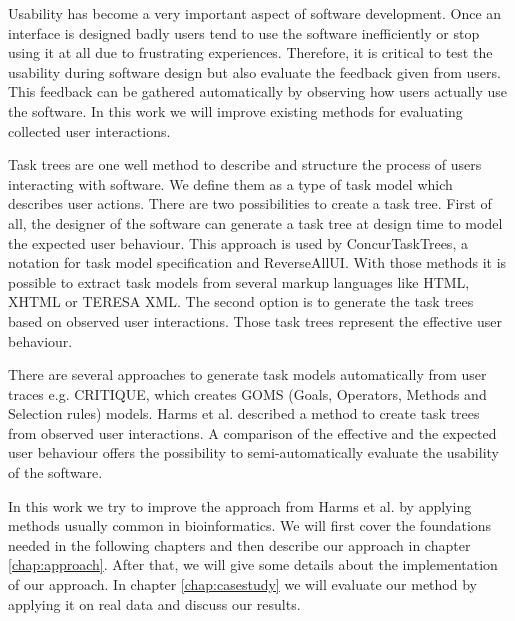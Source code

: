 Usability has become a very important aspect of software development. 
Once an interface is designed badly users tend to use the software inefficiently or stop using it at all due to frustrating experiences.
Therefore, it is critical to test the usability during software design but also evaluate the feedback given from users. 
This feedback can be gathered automatically by observing how users actually use the software.
In this work we will improve existing methods for evaluating collected user interactions.

Task trees are one well method to describe and structure the process of users interacting with software. 
We define them as a type of task model which describes user actions. 
There are two possibilities to create a task tree.
First of all, the designer of the software can generate a task tree at design time to model the expected user behaviour\cite{harms2013}.
This approach is used by ConcurTaskTrees\cite{paterno2003}, a notation for task model specification and ReverseAllUI\cite{bandelloni2008}. 
With those methods it is possible to extract task models from several markup languages like HTML, XHTML or TERESA XML.
The second option is to generate the task trees based on observed user interactions. 
Those task trees represent the effective user behaviour. 

There are several approaches to generate task models automatically from user traces e.g. CRITIQUE\cite{Hudson1999}, which creates GOMS (Goals, Operators, Methods and Selection rules) models.
Harms et al. described a method to create task trees from observed user interactions\cite{harms2013}.
A comparison of the effective and the expected user behaviour offers the possibility to semi-automatically evaluate the usability of the software.  

In this work we try to improve the approach from Harms et al. by applying methods usually common in bioinformatics. 
We will first cover the foundations needed in the following chapters and then describe our approach in chapter \ref{chap:approach}. 
After that, we will give some details about the implementation of our approach. 
In chapter \ref{chap:casestudy} we will evaluate our method by applying it on real data and discuss our results.

